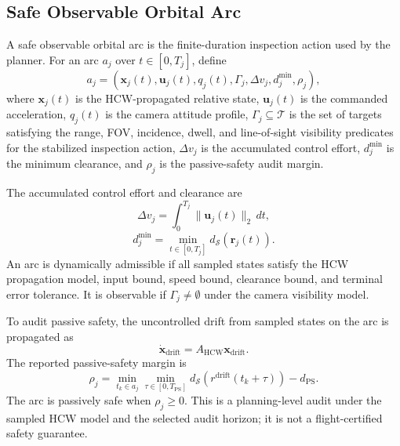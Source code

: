 \subsection{Safe Observable Orbital Arc}

A safe observable orbital arc is the finite-duration inspection action used by
the planner. For an arc $a_j$ over $t\in[0,T_j]$, define
\begin{equation}
    a_j = \left(\mathbf{x}_j(t), \mathbf{u}_j(t), q_j(t), \Gamma_j,
    \Delta v_j, d^{\min}_j, \rho_j\right),
\end{equation}
where $\mathbf{x}_j(t)$ is the HCW-propagated relative state,
$\mathbf{u}_j(t)$ is the commanded
acceleration, $q_j(t)$ is the camera attitude profile, $\Gamma_j\subseteq
\mathcal{T}$ is the set of targets satisfying the range, FOV, incidence,
dwell, and line-of-sight visibility predicates for the stabilized inspection
action, $\Delta v_j$ is the accumulated control effort, $d^{\min}_j$ is the
minimum clearance, and $\rho_j$ is the passive-safety audit margin.

The accumulated control effort and clearance are
\begin{equation}
    \Delta v_j = \int_0^{T_j} \|\mathbf{u}_j(t)\|_2\,dt,
\end{equation}
\begin{equation}
    d^{\min}_j = \min_{t\in[0,T_j]} d_{\mathcal{S}}(\mathbf{r}_j(t)).
\end{equation}
An arc is dynamically admissible if all sampled states satisfy the HCW
propagation model, input bound, speed bound, clearance bound, and terminal
error tolerance. It is observable if $\Gamma_j\neq\emptyset$ under the camera
visibility model.

To audit passive safety, the uncontrolled drift from sampled states on the arc
is propagated as
\begin{equation}
    \dot{\mathbf{x}}_{\mathrm{drift}}
    = A_{\mathrm{HCW}}\mathbf{x}_{\mathrm{drift}}.
\end{equation}
The reported passive-safety margin is
\begin{equation}
    \rho_j = \min_{t_k\in a_j}\min_{\tau\in[0,T_{\mathrm{PS}}]}
    d_{\mathcal{S}}\left(r^{\mathrm{drift}}(t_k+\tau)\right)-d_{\mathrm{PS}}.
\end{equation}
The arc is passively safe when $\rho_j\ge 0$. This is a planning-level audit
under the sampled HCW model and the selected audit horizon; it is not a
flight-certified safety guarantee.

